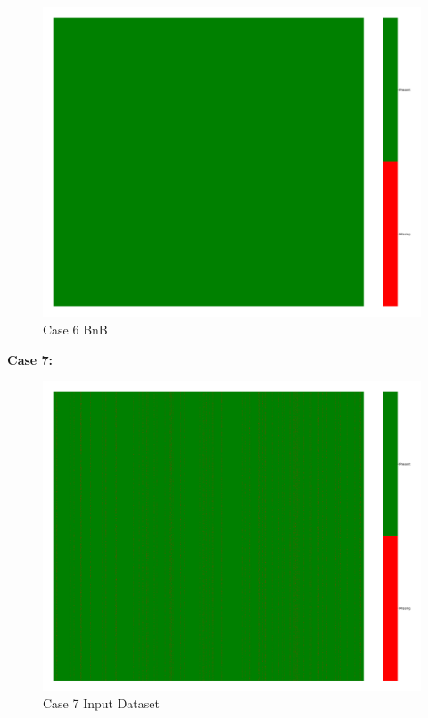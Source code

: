 \documentclass[a4paper,12pt]{article}
\begin{document}
\begin{figure}[H]
    \includegraphics[width=\linewidth]{case6_bnb_heatmap_cleaned.png}
    \caption*{Case 6 BnB}
\end{figure}

\textbf{Case 7:}
\begin{figure}[H]
    \centering
    \includegraphics[width=\linewidth]{case8_heatmap_erased.png}
    \caption*{Case 7 Input Dataset}
\end{figure}
\end{document}
